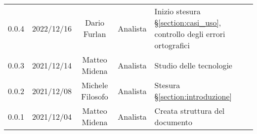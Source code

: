 \begin{center}
\begin{longtable}[c]{c | c | c | c | p{5cm}}
		0.0.4                                                      & 2022/12/16 & Dario Furlan              & Analista     & Inizio stesura §\ref{section:casi_uso}, controllo degli errori ortografici                              \\
		0.0.3                                                      & 2021/12/14 & Matteo Midena             & Analista     & Studio delle tecnologie                                                                                 \\
		0.0.2                                                      & 2021/12/08 & Michele Filosofo          & Analista     & Stesura §\ref{section:introduzione}                                                                     \\
		0.0.1                                                      & 2021/12/04 & Matteo Midena             & Analista     & Creata struttura del documento                                                                          \\
	\end{longtable}
\end{center}